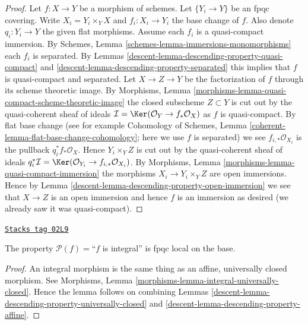 \begin{proof}

Let $f : X \to Y$ be a morphism of schemes.
Let $\{Y_i \to Y\}$ be an fpqc covering.
Write $X_i = Y_i \times_Y X$ and $f_i : X_i \to Y_i$
the base change of $f$. Also denote
$q_i : Y_i \to Y$ the given flat morphisms.
Assume each $f_i$ is a quasi-compact immersion.
By Schemes, Lemma \ref{schemes-lemma-immersions-monomorphisms}
each $f_i$ is separated.
By Lemmas \ref{descent-lemma-descending-property-quasi-compact} and
\ref{descent-lemma-descending-property-separated}
this implies that $f$ is quasi-compact and separated.
Let $X \to Z \to Y$ be the factorization of $f$ through its
scheme theoretic image. By
Morphisms, Lemma \ref{morphisms-lemma-quasi-compact-scheme-theoretic-image}
the closed subscheme $Z \subset Y$ is cut out by the
quasi-coherent sheaf of ideals
$\mathcal{I} = \Ker(\mathcal{O}_Y \to f_*\mathcal{O}_X)$
as $f$ is quasi-compact. By flat base change
(see for example
Cohomology of Schemes, Lemma \ref{coherent-lemma-flat-base-change-cohomology};
here we use $f$ is separated)
we see $f_{i, *}\mathcal{O}_{X_i}$ is the pullback $q_i^*f_*\mathcal{O}_X$.
Hence $Y_i \times_Y Z$ is cut out by the
quasi-coherent sheaf of ideals $q_i^*\mathcal{I} =
\Ker(\mathcal{O}_{Y_i} \to f_{i, *}\mathcal{O}_{X_i})$.
By Morphisms, Lemma \ref{morphisms-lemma-quasi-compact-immersion}
the morphisms $X_i \to Y_i \times_Y Z$
are open immersions. Hence by
Lemma \ref{descent-lemma-descending-property-open-immersion}
we see that $X \to Z$ is an open immersion and
hence $f$ is an immersion as desired
(we already saw it was quasi-compact).
\end{proof}

\begin{lemma}
\label{descent-lemma-descending-property-integral}
\href{https://stacks.math.columbia.edu/tag/02L9}{\texttt{Stacks tag 02L9}}

The property $\mathcal{P}(f) =$``$f$ is integral''
is fpqc local on the base.
\end{lemma}

\begin{proof}

An integral morphism is the same thing as an affine,
universally closed morphism. See
Morphisms, Lemma \ref{morphisms-lemma-integral-universally-closed}.
Hence the lemma follows on combining
Lemmas \ref{descent-lemma-descending-property-universally-closed}
and \ref{descent-lemma-descending-property-affine}.
\end{proof}

